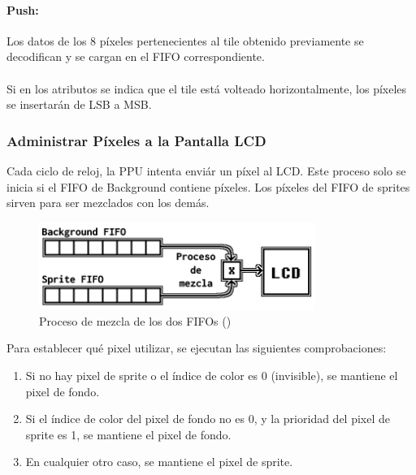 \paragraph{Push:} Los datos de los 8 píxeles pertenecientes al tile obtenido previamente se decodifican y se cargan en el FIFO correspondiente.
\\\\
Si en los atributos se indica que el tile está volteado horizontalmente, los píxeles se insertarán de LSB a MSB.

\subsubsection{Administrar Píxeles a la Pantalla LCD}

Cada ciclo de reloj, la PPU intenta enviár un píxel al LCD. Este proceso solo se inicia si el FIFO de Background contiene píxeles. Los píxeles del FIFO de sprites sirven para ser mezclados con los demás.

\begin{figure}[H]
    \centering
    \includegraphics[width=0.8\textwidth]{include/images/fifo_mixer.png}
    \caption{Proceso de mezcla de los dos FIFOs (\cite{gbedg})}
    \label{figure:fifo_mixer}
\end{figure}

Para establecer qué pixel utilizar, se ejecutan las siguientes comprobaciones:

\begin{enumerate}
    \item Si no hay pixel de sprite o el índice de color es 0 (invisible), se mantiene el pixel de fondo.
    \item Si el índice de color del pixel de fondo no es 0, y la prioridad del pixel de sprite es 1, se mantiene el pixel de fondo.
    \item En cualquier otro caso, se mantiene el pixel de sprite.
\end{enumerate}

\cleardoublepage

